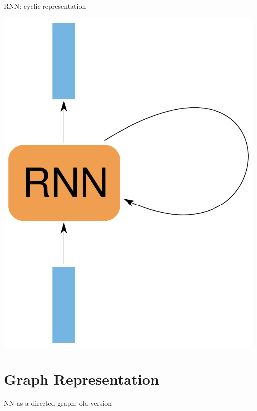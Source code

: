 \documentclass[10pt]{beamer}
\begin{document}
\begin{frame}[fragile]{RNN: cyclic representation}
\begin{center}
\includegraphics[scale=0.5]{images/RNNnaive2.pdf}
\end{center}
\end{frame}


\section{Graph Representation}

\begin{frame}[fragile]{NN as a directed graph: old version}

\end{frame}
\end{document}
